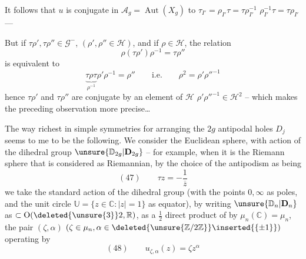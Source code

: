 It follows  that $u$ is conjugate in
$\mathcal A_g=\operatorname{Aut}(X_g)$
to $\tau_{I'}=\rho_{I'}\tau=\tau\rho_{I'}^{-1}$ 
$\rho_{I'}^{-1}\tau=\tau\rho_{I'}$ ---


But if $\tau\rho',\tau\rho''\in\mathcal G^-$, $(\rho',\rho''\in\mathcal H)$, and if
$\rho\in\mathcal H$, the relation
\[
\rho(\tau\rho')\rho^{-1}=\tau\rho''
\]
is equivalent to
\[
\underbrace{\tau\rho\tau}_{\rho^{-1}}\rho'\rho^{-1}=\rho''
\qquad\text{i.e.}\qquad \rho^2=\rho'\rho''^{-1}
\]
hence $\tau\rho'$ and $\tau\rho''$ are conjugate by an element of $\mathcal H$
 $\rho'\rho''^{-1}\in\mathcal H^2$ -- which makes the preceding observation more precise\ldots

The way richest in simple symmetries for arranging the $2g$ antipodal holes
$D_j$ seems to me to be the following. We  consider
the Euclidean sphere, with  action of the dihedral group
$\unsure{\mathbb D_{2g}|\mathbf D_{2g}}$ -- for example, when it is the Riemann sphere that is
considered as Riemannian, by the choice of the antipodism as being
\[
(47)\qquad \tau z=-\frac{1}{\overline z}
\]
we take the standard action of the dihedral group (with the points $0,\infty$ as poles, and
the unit circle $\mathbb U=\{z\in\mathbb C\mathbin{:}|z|=1\}$ as equator),
 by writing
$\unsure{\mathbb D_n|\mathbf D_n}$ as $\subset\operatorname O(\deleted{\unsure{3}}2,\mathbb R)$,
as a $\frac12$ direct product of
 by $\mu_n(\mathbb C)=\mu_n$,
the pair $(\zeta,\alpha)$ $(\zeta\in\mu_n,\alpha\in\deleted{\unsure{\mathbb Z/2\mathbb Z}}\inserted{\{\pm1\}})$ operating by
\[
(48)\qquad u_{\zeta,\alpha}(z)=\zeta z^\alpha
\]

